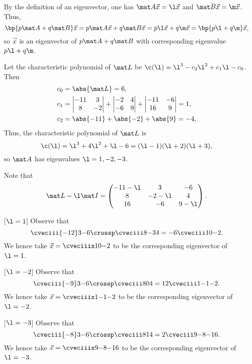 \begin{solution}
    By the definition of an eigenvector, one has $\mat A \vec x = \l \vec x$ and $\mat B \vec x = \m \vec x$. Thus, \[\bp{p\mat A + q\mat B}\vec x = p \mat A \vec x + q\mat B \vec x = p \l \vec x + q \m \vec x = \bp{p \l + q \m} \vec x,\] so $\vec x$ is an eigenvector of $p\mat A + q\mat B$ with corresponding eigenvalue $p\l + q\m$.

    Let the characteristic polynomial of $\mat L$ be $\c(\l) = \l^3 - c_2 \l^2 + c_1 \l - c_0$. Then
    \begin{align*}
        c_0 &= \abs{\mat L} = 6,\\
        c_1 &= \begin{vmatrix}-11 & 3 \\ 8 & -2\end{vmatrix} + \begin{vmatrix}-2 & 4 \\ -6 & 9\end{vmatrix} + \begin{vmatrix}-11 & -6 \\ 16 & 9\end{vmatrix} = 1,\\
        c_2 &= \abs{-11} + \abs{-2} + \abs{9} = -4,
    \end{align*}
    Thus, the characteristic polynomial of $\mat L$ is \[\c(\l) = \l^3 + 4\l^2 + \l - 6 = (\l - 1)(\l + 2)(\l + 3),\] so $\mat A$ has eigenvalues $\l = 1, -2, -3$.

    Note that \[\mat L - \l \mat I = \begin{pmatrix}-11-\l & 3 & -6 \\ 8 & -2-\l & 4 \\ 16 & -6 & 9-\l\end{pmatrix}.\]

    [$\l = 1$] Observe that \[\cveciii{-12}3{-6} \crossp \cveciii8{-3}{4} = -6 \cveciii10{-2}.\] We hence take $\vec x = \cveciiix10{-2}$ to be the corresponding eigenvector of $\l = 1$.

    [$\l = -2$] Observe that \[\cveciii{-9}3{-6} \crossp \cveciii8{0}{4} = 12 \cveciii1{-1}{-2}.\] We hence take $\vec x = \cveciiix1{-1}{-2}$ to be the corresponding eigenvector of $\l = -2$.

    [$\l = -3$] Observe that \[\cveciii{-8}3{-6} \crossp \cveciii8{1}{4} = 2 \cveciii9{-8}{-16}.\] We hence take $\vec x = \cveciiix9{-8}{-16}$ to be the corresponding eigenvector of $\l = -3$.


\end{solution}
